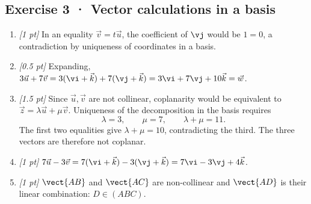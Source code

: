 \subsection*{Exercise 3 · Vector calculations in a basis}\begin{enumerate}

\item \textit{[1 pt]} In an equality $\vec v=t\vec u$, the coefficient of $\vj $ would be $1=0$, a contradiction by uniqueness of coordinates in a basis.

\item \textit{[0.5 pt]} Expanding, $3\vec u+7\vec v=3(\vi +\vec k)+7(\vj +\vec k)=3\vi +7\vj +10\vec k=\vec w$.

\item \textit{[1.5 pt]} Since $\vec u,\vec v$ are not collinear, coplanarity would be equivalent to $\vec z=\lambda\vec u+\mu\vec v$. Uniqueness of the decomposition in the basis requires
\[\lambda=3,\qquad\mu=7,\qquad\lambda+\mu=11.\]
The first two equalities give $\lambda+\mu=10$, contradicting the third. The three vectors are therefore not coplanar.

\item \textit{[1 pt]} $7\vec u-3\vec v=7(\vi +\vec k)-3(\vj +\vec k)=7\vi -3\vj +4\vec k$.

\item \textit{[1 pt]} $\vect{AB}$ and $\vect{AC}$ are non-collinear and $\vect{AD}$ is their linear combination: $D\in(ABC)$.

\end{enumerate}


